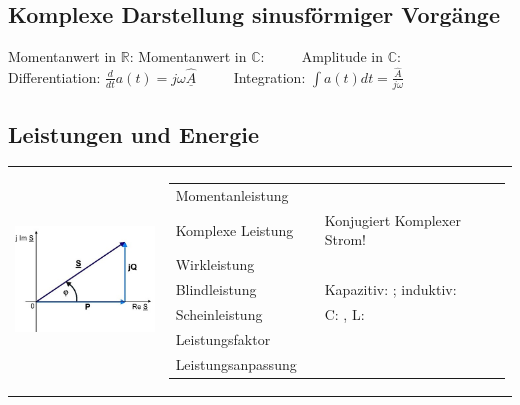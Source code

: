 	\subsection{Komplexe Darstellung sinusförmiger Vorgänge}
	Momentanwert in $\mathbb{R}$:  \qquad
	Momentanwert in $\mathbb{C}$:  $\qquad$ 
	Amplitude in $\mathbb{C}$: \\
	
	Differentiation: $\frac{d}{dt} a(t) = j \omega \underline{\hat{A}}$ $\qquad$ 
	Integration: $\int a(t) dt = \frac{\hat{A}}{j \omega}$
	
	\subsection{Leistungen und Energie}
	\begin{tabular}{ll}
   		\parbox{4cm}{
   			\includegraphics[width=4cm]{./bilder/zeigerdiag-leistungen.png}}
   		& \parbox{14cm}{
			\begin{tabular}{p{3cm}p{5cm}p{5.5cm}}
	      		Momentanleistung
	      			& $p(t) = u(t) i(t)$
	      			\\
				Komplexe Leistung 
					& $ \underline{S} = \underline{U} \cdot \underline{I}^\ast = U\cdot I \cdot
					e^{j(\varphi_u-\varphi_i)}$  & Konjugiert Komplexer Strom! \\
				Wirkleistung
					& $ P = \Real(\underline{S}) = U I \cos(\varphi) $ \\
				Blindleistung 
					& $ Q = \Imag(\underline{S}) = U I \sin(\varphi) $
					& Kapazitiv: $Q < 0$; induktiv: $Q > 0$ \\
				Scheinleistung
					& $ S = | \underline{S} | = U I = \frac{U^2}{R} = I^2 R$ 
					& C: $Q_c=-\omega CU_C^2$, L: $Q_L=\omega LI_L^2$\\
				Leistungsfaktor
					& $\cos \varphi = \frac{P}{S} = \frac{P}{UI}$ \\
				Leistungsanpassung
					& $\underline{Z}_L = \underline{Z}_i^{\ast}; \; P_{max} = \frac{U_q^2}{4
					R_i} = \frac{I_q^2 R_i}{4} $
			\end{tabular}}
   	\end{tabular}

